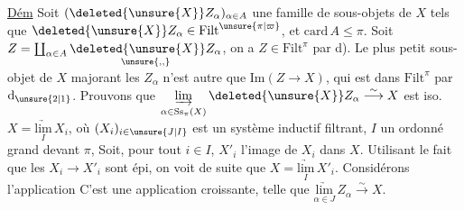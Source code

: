 
\uline{Dém} Soit $(\deleted{\unsure{X}}Z_\alpha)_{\alpha\in A}$ une famille de sous-objets
de $X$ tels que $\deleted{\unsure{X}}Z_\alpha\in\mathrm{Filt}^{\unsure{\pi|\varpi}}$, et $\mathrm{card}\,A\leq\pi$.
Soit $Z=\coprod_{\alpha\in A}\underset{\unsure{,,}}{\deleted{\unsure{X}}Z_\alpha}$, on a $Z\in\mathrm{Filt}^{\pi}$ par d).
Le plus petit sous-objet de $X$ majorant les
$Z_\alpha$ n'est autre que $\mathrm{Im}(Z\to X)$, qui
est dans $\mathrm{Filt}^{\pi}$ par $\mathrm d_{\unsure{2|1}}$. Prouvons que
$\underset{\alpha\in\mathrm{Ss}_{\pi}(X)}{\underrightarrow{\mathrm{lim}}}\,\deleted{\unsure{X}}Z_{\alpha}\overset{\sim}{\longrightarrow}X$ est iso.  
 $X=\underset{I}{\underrightarrow{\mathrm{lim}}}\,X_i$, où $(X_i)_{i\in\unsure{J|I}}$ est
un système inductif filtrant, $I$ un
ordonné grand devant $\pi$,  Soit, pour tout
$i\in I$, $X'_i$ l'image de $X_i$ dans $X$.
Utilisant le fait que les $X_i\to X'_i$ sont
épi, on voit de suite que $X=\underset{I}{\underrightarrow{\mathrm{lim}}}\,X'_i$.
Considérons l'application
C'est une application croissante,   telle
 que $\underset{\alpha\in J}{\underrightarrow{\mathrm{lim}}}\,Z_\alpha\overset{\sim}{\longrightarrow}X$.


